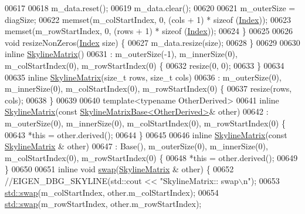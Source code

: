 \begin{DoxyCode}
00617 
00618         m\_data.reset();
00619         m\_data.clear();
00620 
00621         m\_outerSize = diagSize;
00622         memset(m\_colStartIndex, 0, (cols + 1) * \textcolor{keyword}{sizeof} (\hyperlink{group___core___module_a554f30542cc2316add4b1ea0a492ff02}{Index}));
00623         memset(m\_rowStartIndex, 0, (rows + 1) * \textcolor{keyword}{sizeof} (\hyperlink{group___core___module_a554f30542cc2316add4b1ea0a492ff02}{Index}));
00624     \}
00625 
00626     \textcolor{keywordtype}{void} resizeNonZeros(\hyperlink{group___core___module_a554f30542cc2316add4b1ea0a492ff02}{Index} size) \{
00627         m\_data.resize(size);
00628     \}
00629 
00630     \textcolor{keyword}{inline} \hyperlink{class_eigen_1_1_skyline_matrix}{SkylineMatrix}()
00631     : m\_outerSize(-1), m\_innerSize(0), m\_colStartIndex(0), m\_rowStartIndex(0) \{
00632         resize(0, 0);
00633     \}
00634 
00635     \textcolor{keyword}{inline} \hyperlink{class_eigen_1_1_skyline_matrix}{SkylineMatrix}(\textcolor{keywordtype}{size\_t} rows, \textcolor{keywordtype}{size\_t} cols)
00636     : m\_outerSize(0), m\_innerSize(0), m\_colStartIndex(0), m\_rowStartIndex(0) \{
00637         resize(rows, cols);
00638     \}
00639 
00640     \textcolor{keyword}{template}<\textcolor{keyword}{typename} OtherDerived>
00641     \textcolor{keyword}{inline} \hyperlink{class_eigen_1_1_skyline_matrix}{SkylineMatrix}(\textcolor{keyword}{const} \hyperlink{class_eigen_1_1_skyline_matrix_base}{SkylineMatrixBase<OtherDerived>}&
       other)
00642     : m\_outerSize(0), m\_innerSize(0), m\_colStartIndex(0), m\_rowStartIndex(0) \{
00643         *\textcolor{keyword}{this} = other.derived();
00644     \}
00645 
00646     \textcolor{keyword}{inline} \hyperlink{class_eigen_1_1_skyline_matrix}{SkylineMatrix}(\textcolor{keyword}{const} \hyperlink{class_eigen_1_1_skyline_matrix}{SkylineMatrix} & other)
00647     : Base(), m\_outerSize(0), m\_innerSize(0), m\_colStartIndex(0), m\_rowStartIndex(0) \{
00648         *\textcolor{keyword}{this} = other.derived();
00649     \}
00650 
00651     \textcolor{keyword}{inline} \textcolor{keywordtype}{void} \hyperlink{endian_8c_a3ca5ecd34b04d6a243c054ac3a57f68d}{swap}(\hyperlink{class_eigen_1_1_skyline_matrix}{SkylineMatrix} & other) \{
00652         \textcolor{comment}{//EIGEN\_DBG\_SKYLINE(std::cout << "SkylineMatrix:: swap\(\backslash\)n");}
00653         \hyperlink{endian_8c_a3ca5ecd34b04d6a243c054ac3a57f68d}{std::swap}(m\_colStartIndex, other.m\_colStartIndex);
00654         \hyperlink{endian_8c_a3ca5ecd34b04d6a243c054ac3a57f68d}{std::swap}(m\_rowStartIndex, other.m\_rowStartIndex);

\end{DoxyCode}
